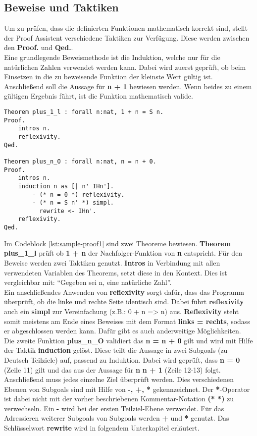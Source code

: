 \subsection{Beweise und Taktiken}
Um zu prüfen, dass die definierten Funktionen mathematisch korrekt sind, stellt der Proof Assistent verschiedene Taktiken zur Verfügung. Diese werden zwischen den \textbf{Proof.} und \textbf{Qed.}.\\
Eine grundlegende Beweismethode ist die Induktion, welche nur für die natürlichen Zahlen verwendet werden kann. Dabei wird zuerst geprüft, ob beim Einsetzen in die zu beweisende Funktion der kleinste Wert gültig ist. Anschließend soll die Aussage für \textbf{n + 1} bewiesen werden. Wenn beides zu einem gültigen Ergebnis führt, ist die Funktion mathematisch valide.
\begin{lstlisting}[language=coq,firstnumber=1,caption=Coq Beispielbeweis,label=lst:sample-proof1]
Theorem plus_1_l : forall n:nat, 1 + n = S n.
Proof.
	intros n. 
	reflexivity. 
Qed.

Theorem plus_n_O : forall n:nat, n = n + 0.
Proof.
	intros n. 
	induction n as [| n' IHn'].
		- (* n = 0 *) reflexivity.
		- (* n = S n' *) simpl.
		  rewrite <- IHn'.
	reflexivity.
Qed.
\end{lstlisting}
Im Codeblock \ref{lst:sample-proof1} sind zwei Theoreme bewiesen. \textbf{Theorem plus\_1\_l} prüft ob \textbf{1 + n} der Nachfolger-Funktion von \textbf{n} entspricht.
Für den Beweise werden zwei Taktiken genutzt. \textbf{Intros} in Verbindung mit allen verwendeten Variablen des Theorems, setzt diese in den Kontext. Dies ist vergleichbar mit: "`Gegeben sei n, eine natürliche Zahl"'.\\
Ein anschließendes Anwenden von \textbf{reflexivity} sorgt dafür, dass das Programm überprüft, ob die linke und rechte Seite identisch sind. Dabei führt \textbf{reflexivity} auch ein \textbf{simpl} zur Vereinfachung (z.B.: 0 + n => n) aus. \textbf{Reflexivity} steht somit meistens am Ende eines Beweises mit dem Format \textbf{links = rechts}, sodass er abgeschlossen werden kann. Dafür gibt es auch anderweitige Möglichkeiten.\\
Die zweite Funktion \textbf{plus\_n\_O} validiert das \textbf{n = n + 0} gilt und wird mit Hilfe der Taktik \textbf{induction} gelöst. Diese teilt die Aussage in zwei Subgoals (zu Deutsch Teilziele) auf, passend zu Induktion. Dabei wird geprüft, dass \textbf{n = 0} (Zeile 11) gilt und das aus der Aussage für \textbf{n} \textbf{n + 1} (Zeile 12-13) folgt.
Anschließend muss jedes einzelne Ziel überprüft werden. Dies verschiedenen Ebenen von Subgoals sind mit Hilfe von \textbf{-, +, *} gekennzeichnet. Der \textbf{*}-Operator ist dabei nicht mit der vorher beschriebenen Kommentar-Notation \textbf{(* *)} zu verwechseln. Ein \textbf{-} wird bei der ersten Teilziel-Ebene verwendet. Für das Adressieren weiterer Subgoals von Subgoals werden \textbf{+} und \textbf{*} genutzt. Das Schlüsselwort \textbf{rewrite} wird in folgendem Unterkapitel erläutert.


